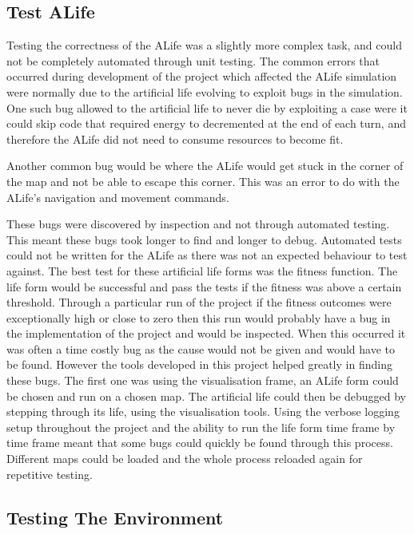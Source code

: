 \documentclass[12pt]{article}
\begin{document}
\subsection{Test ALife}

Testing the correctness of the ALife was a slightly more complex task, and could not be completely automated through unit testing.
The common errors that occurred during development of the project which affected the ALife simulation were normally due to the
artificial life evolving to exploit bugs in the simulation. One such bug allowed to the artificial life to never die by exploiting
a case were it could skip code that required energy to decremented at the end of each turn, and therefore the ALife did not need
to consume resources to become fit.

Another common bug would be where the ALife would get stuck in the corner of the map and not be able to escape this corner. This
was an error to do with the ALife's navigation and movement commands.

These bugs were discovered by inspection and not through automated testing. This meant these bugs took longer to find and longer to
debug. Automated tests could not be written for the ALife as there was not an expected behaviour to test against. The best
test for these artificial life forms was the fitness function. The life form would be successful and pass the tests if the fitness
was above a certain threshold. Through a particular run of the project if the fitness outcomes were exceptionally high or close to 
zero then this run would probably have a bug in the implementation of the project and would be inspected. When this occurred
it was often a time costly bug as the cause would not be given and would have to be found. However the tools developed in this
project helped greatly in finding these bugs. The first one was using the visualisation frame, an ALife form could be chosen
and run on a chosen map. The artificial life could then be debugged by stepping through its life, using the visualisation tools.
Using the verbose logging setup throughout the project and the ability to run the life form time frame by time frame meant that
some bugs could quickly be found through this process. Different maps could be loaded and the whole process reloaded again for
repetitive testing. 


\subsection{Testing The Environment}
\end{document}
